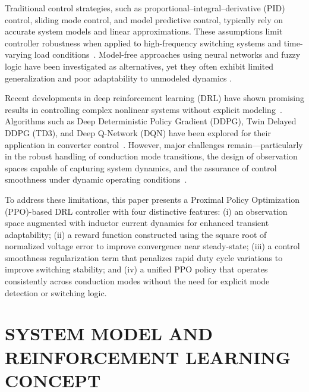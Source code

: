 \documentclass[conference]{IEEEtran}
\begin{document}
Traditional control strategies, such as proportional--integral--derivative (PID) control, sliding mode control, and model predictive control, typically rely on accurate system models and linear approximations. These assumptions limit controller robustness when applied to high-frequency switching systems and time-varying load conditions~\cite{cui2021voltage}. Model-free approaches using neural networks and fuzzy logic have been investigated as alternatives, yet they often exhibit limited generalization and poor adaptability to unmodeled dynamics \cite{zhao2020overview,benachour2024generalized}.

Recent developments in deep reinforcement learning (DRL) have shown promising results in controlling complex nonlinear systems without explicit modeling~\cite{gheisarnejad2020iot,feng2024deep}. Algorithms such as Deep Deterministic Policy Gradient (DDPG), Twin Delayed DDPG (TD3), and Deep Q-Network (DQN) have been explored for their application in converter control~\cite{cui2021voltage,tang2021artificial,ye2024td3,muktiadji2024twin,cui2021transferring,kishore2022performance}. However, major challenges remain—particularly in the robust handling of conduction mode transitions, the design of observation spaces capable of capturing system dynamics, and the assurance of control smoothness under dynamic operating conditions~\cite{min2022voltage,ye2024deep}.

To address these limitations, this paper presents a Proximal Policy Optimization (PPO)-based DRL controller with four distinctive features:  
(i) an observation space augmented with inductor current dynamics for enhanced transient adaptability;  
(ii) a reward function constructed using the square root of normalized voltage error to improve convergence near steady-state;  
(iii) a control smoothness regularization term that penalizes rapid duty cycle variations to improve switching stability; and  
(iv) a unified PPO policy that operates consistently across conduction modes without the need for explicit mode detection or switching logic.




\section{SYSTEM MODEL AND REINFORCEMENT LEARNING CONCEPT}
\end{document}

